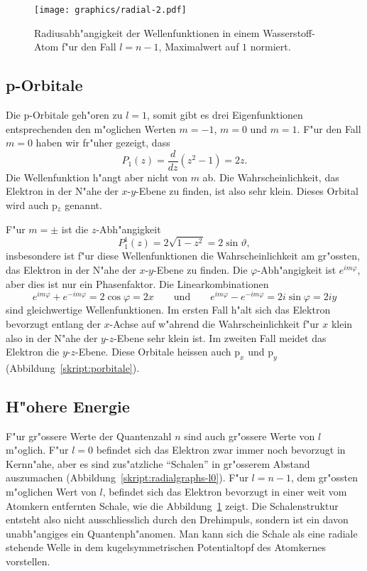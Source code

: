 \begin{figure}
\centering
\texttt{[image: graphics/radial-2.pdf]}
\caption{Radiusabh"angigkeit der Wellenfunktionen in einem Wasserstoff-Atom
f"ur den Fall $l=n-1$,
Maximalwert auf $1$ normiert.
\label{skript:radialgraphs-maxl}}
\end{figure}

\subsection{p-Orbitale}
Die p-Orbitale geh"oren zu $l=1$, somit gibt es drei Eigenfunktionen
entsprechenden den m"oglichen Werten $m=-1$, $m=0$ und $m=1$.
F"ur den Fall $m=0$ haben wir fr"uher gezeigt, dass
\[
P_1(z)=\frac{d}{dz}(z^2-1)=2z.
\]
Die Wellenfunktion h"angt aber nicht von $m$ ab.
Die Wahrscheinlichkeit, das Elektron in der N"ahe der $x$-$y$-Ebene
zu finden, ist also sehr klein.
Dieses Orbital wird auch p$\mathstrut_z$ genannt.

F"ur $m=\pm$ ist die $z$-Abh"angigkeit
\[
P_1^1(z)=2\sqrt{1-z^2} = 2\sin\vartheta,
\]
insbesondere ist f"ur diese Wellenfunktionen die Wahrscheinlichkeit 
am gr"ossten, das Elektron in der N"ahe der $x$-$y$-Ebene zu finden.
Die $\varphi$-Abh"angigkeit ist $e^{im\varphi}$, aber dies ist
nur ein Phasenfaktor.
Die Linearkombinationen
\[
e^{im\varphi}+e^{-im\varphi}=2\cos\varphi=2x
\qquad\text{und}\qquad
e^{im\varphi}-e^{-im\varphi}=2i\sin\varphi=2iy
\]
sind gleichwertige Wellenfunktionen.
Im ersten Fall h"alt sich das Elektron bevorzugt entlang der $x$-Achse
auf w"ahrend die Wahrscheinlichkeit f"ur $x$ klein also in der N"ahe der
$y$-$z$-Ebene sehr klein ist.
Im zweiten Fall meidet das Elektron die $y$-$z$-Ebene.
Diese Orbitale heissen auch $\text{p}_x$ und $\text{p}_y$
(Abbildung~\ref{skript:porbitale}).

\subsection{H"ohere Energie}
F"ur gr"ossere Werte der Quantenzahl $n$ sind auch gr"ossere Werte
von $l$ m"oglich.
F"ur $l=0$ befindet sich das Elektron zwar immer noch bevorzugt in 
Kernn"ahe, aber es sind zus"atzliche ``Schalen'' in gr"osserem Abstand
auszumachen (Abbildung~\ref{skript:radialgraphs-l0}).
F"ur $l=n-1$, dem gr"ossten m"oglichen Wert von $l$,
befindet sich das Elektron
bevorzugt in einer weit vom Atomkern entfernten Schale, wie die
Abbildung~\ref{skript:radialgraphs-maxl} zeigt.
Die Schalenstruktur entsteht also nicht ausschliesslich durch den 
Drehimpuls, sondern ist ein davon unabh"angiges ein Quantenph"anomen.
Man kann sich die Schale als eine radiale stehende Welle in dem
kugelsymmetrischen Potentialtopf des Atomkernes vorstellen.

